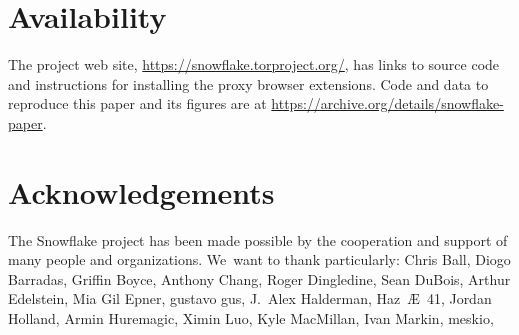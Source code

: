 \documentclass[letterpaper,twocolumn]{article}
\begin{document}
\section*{Availability}

The project web site,
\url{https://snowflake.torproject.org/},
has links to source code
and instructions for installing the proxy browser extensions.
Code and data to reproduce
this paper and its figures are at
\url{https://archive.org/details/snowflake-paper}.

\section*{Acknowledgements}

The Snowflake project has been made possible
by the cooperation and support of many people
and organizations.
We~want to thank particularly:
Chris Ball, %
Diogo Barradas, %
Griffin Boyce, %
Anthony Chang, %
Roger Dingledine, %
Sean DuBois, %
Arthur Edelstein, %
Mia Gil Epner, %
gustavo gus, %
J.~Alex Halderman,
Haz~Æ~41, %
Jordan Holland, %
Armin Huremagic, %
Ximin Luo, %
Kyle MacMillan, %
Ivan Markin, %
meskio, %
\end{document}
